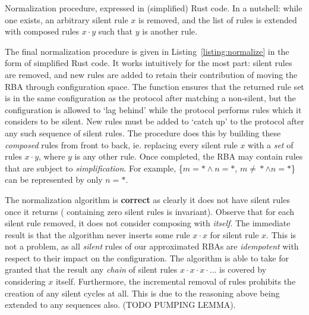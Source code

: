 \begin{listing}[ht]
	\inputminted[]{rust}{normalize.rs}
	\caption[Normalization procedure Rusty-pseudocode.]{Normalization procedure, expressed in (simplified) Rust code. In a nutshell: while one exists, an arbitrary silent rule $x$ is removed, and the list of rules is extended with composed rules $x\cdot{}y$ such that $y$ is another rule.}
	\label{listing:normalize}
\end{listing}

The final normalization procedure is given in Listing~\ref{listing:normalize} in the form of simplified Rust code. It works intuitively for the most part: silent rules are removed, and new rules are added to retain their contribution of moving the RBA through configuration space. The function  ensures that the returned rule set is in the same configuration as the protocol after matching a non-silent, but the configuration is allowed to `lag behind' while the protocol performs rules which it considers to be silent. New rules must be added to `catch up' to the protocol after any such sequence of silent rules. The procedure does this by building these \textit{composed} rules from front to back, ie. replacing every silent rule $x$ with a \textit{set} of rules $x\cdot{}y$, where $y$ is any other rule. Once completed, the RBA may contain rules that are subject to \textit{simplification}. For example, \{$m=*\wedge{}n=*$, $m\neq{}*\wedge{}n=*$\} can be represented by only $n=*$.

The normalization algorithm is \textbf{correct} as clearly it does not have silent rules once it returns ( containing zero silent rules is invariant). Observe that for each silent rule removed, it does not consider composing with \textit{itself}. The immediate result is that the algorithm never inserts some rule $x\cdot{}x$ for silent rule $x$. This is not a problem, as all \textit{silent} rules of our approximated RBAs are \textit{idempotent} with respect to their impact on the configuration. The algorithm is able to take for granted that the result any \textit{chain} of silent rules $x\cdot{}x\cdot{}x\cdot{}...$ is covered by considering $x$ itself. Furthermore, the incremental removal of rules prohibits the creation of any silent cycles at all. This is due to the reasoning above being extended to any sequences also. (TODO PUMPING LEMMA).


